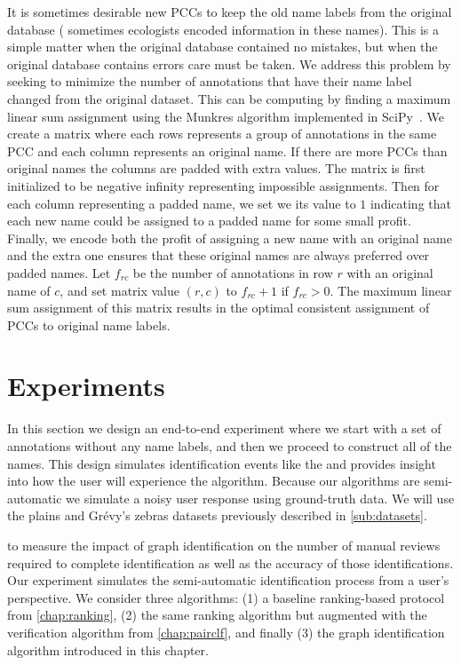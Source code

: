 It is sometimes desirable new PCCs to keep the old name labels from the original database (\eg{} sometimes ecologists
encoded information in these names). This is a simple matter when the original database contained no mistakes, but when
the original database contains errors care must be taken. We address this problem by seeking to minimize the number of
annotations that have their name label changed from the original dataset. This can be computing by finding a maximum
linear sum assignment using the Munkres algorithm implemented in SciPy~\cite{eric_jones_scipy_2001}. We create a matrix
where each rows represents a group of annotations in the same PCC and each column represents an original name. If there
are more PCCs than original names the columns are padded with extra values. The matrix is first initialized to be
negative infinity representing impossible assignments. Then for each column representing a padded name, we set we its
value to $1$ indicating that each new name could be assigned to a padded name for some small profit. Finally, we encode
both the profit of assigning a new name with an original name and the extra one ensures that these original names are
always preferred over padded names. Let $f_{rc}$ be the number of annotations in row $r$ with an original name of $c$,
and set matrix value $(r, c)$ to $f_{rc} + 1$ if $f_{rc} > 0$. The maximum linear sum assignment of this matrix results
in the optimal consistent assignment of PCCs to original name labels.
  
  
\section{Experiments}\label{sec:graphexpt}

    In this section we design an end-to-end experiment where we start with a set of annotations without any name
      labels, and then we proceed to construct all of the names.
    This design simulates identification events like the \GZC{} and provides insight into how the user will
      experience the algorithm.
    Because our algorithms are semi-automatic we simulate a noisy user response using ground-truth data.
    We will use the plains and Grévy's zebras datasets previously described in \cref{sub:datasets}.
    
    to measure the impact of graph identification on the number of manual reviews required to complete
      identification as well as the accuracy of those identifications.
    Our experiment simulates the semi-automatic identification process from a user's perspective.
    We consider three algorithms:
    (1) a baseline ranking-based protocol from \cref{chap:ranking},
    (2) the same ranking algorithm but augmented with the verification algorithm from \cref{chap:pairclf}, and
      finally
    (3) the graph identification algorithm introduced in this chapter.

